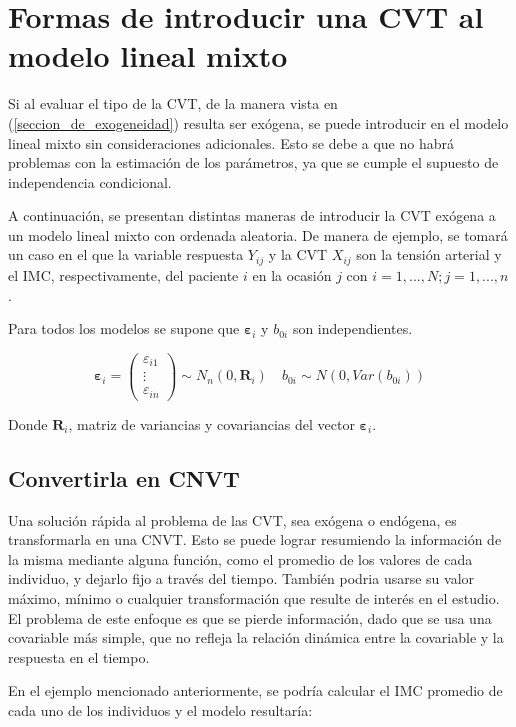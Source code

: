 \documentclass[spanish]{article}
\numberwithin{figure}{subsection}
\numberwithin{equation}{subsection}
\numberwithin{table}{subsection}
\begin{document}
\newpage

\section{Formas de introducir una CVT al modelo lineal mixto}

Si al evaluar el tipo de la CVT, de la manera vista en
(\ref{seccion_de_exogeneidad}) resulta ser exógena, se puede introducir en el
modelo lineal mixto sin consideraciones adicionales. Esto se debe a que no habrá
problemas con la estimación de los parámetros, ya que se cumple el supuesto de
independencia condicional.

A continuación, se presentan distintas maneras de introducir la CVT exógena a un
modelo lineal mixto con ordenada aleatoria. De manera de ejemplo, se tomará un
caso en el que la variable respuesta $Y_{ij}$ y la CVT $X_{ij}$ son la tensión
arterial y el IMC, respectivamente, del paciente $i$ en la ocasión $j$ con
$i = 1, ..., N; j = 1, ..., n$.

Para todos los modelos se supone que $\bm{\varepsilon}_i$ y $b_{0i}$ son
independientes.

\[ 
	\bm{\varepsilon}_i = \begin{pmatrix} \varepsilon_{i1} \\ \vdots \\ \varepsilon_{in} \end{pmatrix} \sim N_{n}(0, \bm{R}_i)
	\quad
	b_{0i} \sim N(0, Var(b_{0i}))
\]

Donde $\bm{R}_i$, matriz de variancias y covariancias del vector
$\bm{\varepsilon}_{i}$.

\subsection{Convertirla en CNVT}

Una solución rápida al problema de las CVT, sea exógena o endógena, es
transformarla en una CNVT. Esto se puede lograr resumiendo la información de la
misma mediante alguna función, como el promedio de los valores de cada
individuo, y dejarlo fijo a través del tiempo. También podria usarse su valor
máximo, mínimo o cualquier transformación que resulte de interés en el estudio.
El problema de este enfoque es que se pierde información, dado que se usa una
covariable más simple, que no refleja la relación dinámica entre la covariable y
la respuesta en el tiempo.

En el ejemplo mencionado anteriormente, se podría calcular el IMC promedio de
cada uno de los individuos y el modelo resultaría:
\end{document}
